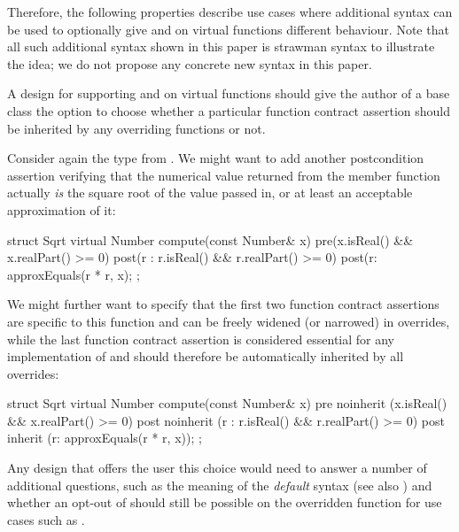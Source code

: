 Therefore, the following properties describe use cases where additional syntax can be used to optionally give  and  on virtual functions different behaviour. Note that all such additional syntax shown in this paper is strawman syntax to illustrate the idea; we do not propose any concrete new syntax in this paper.

 
A design for supporting  and  on virtual functions should give the author of a base class the option to choose whether a particular function contract assertion should be inherited by any overriding functions or not.

Consider again the  type from . We might want to add another postcondition assertion verifying that the numerical value returned from the  member function actually \emph{is} the square root of the value passed in, or at least an acceptable approximation of it:

\begin{codeblock}
struct Sqrt {
  virtual Number compute(const Number& x)
    pre(x.isReal() && x.realPart() >= 0)
    post(r : r.isReal() && r.realPart() >= 0)
    post(r: approxEquals(r * r, x);
};
\end{codeblock}

We might further want to specify that the first two function contract assertions are specific to this function and can be freely widened (or narrowed) in overrides, while the last function contract assertion is considered essential for any implementation of  and should therefore be automatically inherited by all overrides:

\begin{codeblock}
struct Sqrt {
  virtual Number compute(const Number& x)
    pre noinherit (x.isReal() && x.realPart() >= 0)
    post noinherit (r : r.isReal() && r.realPart() >= 0)
    post inherit (r: approxEquals(r * r, x));
};
\end{codeblock}

Any design that offers the user this choice would need to answer a number of additional questions, such as the meaning of the \emph{default} syntax (see also ) and whether an opt-out of  should still be possible on the overridden function for use cases such as .


